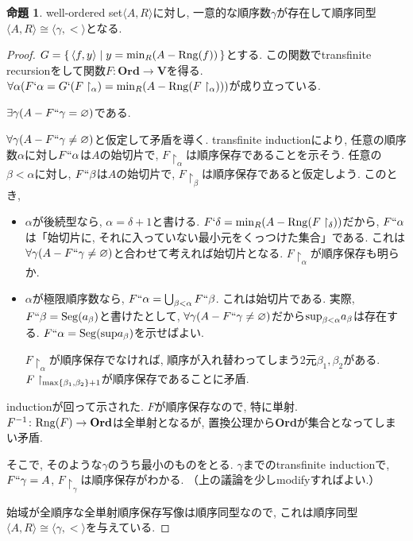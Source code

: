 \documentclass[a4paper, twoside]{bxjsarticle}
\theoremstyle{definition}
\newtheorem{prop}[thm]{命題}
\begin{document}
    \begin{prop}\label{ordinalthm}
        well-ordered set$\langle A, R\rangle$に対し, 一意的な順序数$\gamma$が存在して順序同型$\langle A, R\rangle \cong\langle\gamma, <\rangle$となる.
    \end{prop}
    \begin{proof}
        $G=\set{\langle f, y\rangle|y={\rm min}_R(A-{\rm Rng}(f))}$とする. この関数でtransfinite recursionをして関数$F\colon \textbf{Ord}\to\textbf{V}$を得る. $\forall \alpha (F`\alpha=G`(F\restriction_\alpha)={\rm min}_R(A-{\rm Rng}(F\restriction_\alpha)))$が成り立っている.
        
        $\exists \gamma(A-F``\gamma = \varnothing)$である.
        \begin{framed}
            $\forall \gamma(A-F``\gamma \neq\varnothing)$と仮定して矛盾を導く. transfinite inductionにより, 任意の順序数$\alpha$に対し$F``\alpha$は$A$の始切片で, $F\restriction_\alpha$は順序保存であることを示そう. 任意の$\beta<\alpha$に対し, $F``\beta$は$A$の始切片で, $F\restriction_\beta$は順序保存であると仮定しよう. このとき, 
            \begin{itemize}
                \item $\alpha$が後続型なら, $\alpha = \delta+1$と書ける. $F`\delta = {\rm min}_R(A-{\rm Rng}(F\restriction_\delta))$だから, $F``\alpha$は「始切片に, それに入っていない最小元をくっつけた集合」である. これは$\forall \gamma(A-F``\gamma \neq\varnothing)$と合わせて考えれば始切片となる. $F\restriction_\alpha$が順序保存も明らか.
                \item $\alpha$が極限順序数なら, $F``\alpha=\bigcup_{\beta<\alpha}F``\beta$. これは始切片である. 実際, $F``\beta = {\rm Seg}(a_\beta)$と書けたとして, $\forall \gamma(A-F``\gamma \neq\varnothing)$だから${\rm sup}_{\beta<\alpha}a_\beta$は存在する. $F``\alpha = {\rm Seg}({\rm sup}a_\beta)$を示せばよい.
                
                $F\restriction_\alpha$が順序保存でなければ, 順序が入れ替わってしまう2元$\beta_1, \beta_2$がある. $F\restriction_{{\rm max}\{\beta_1, \beta_2\}+1}$が順序保存であることに矛盾.
            \end{itemize}
            inductionが回って示された. $F$が順序保存なので, 特に単射. $F^{-1}\colon{\rm Rng}(F)\to\textbf{Ord}$は全単射となるが, 置換公理から\textbf{Ord}が集合となってしまい矛盾.
        \end{framed}
        そこで, そのような$\gamma$のうち最小のものをとる. $\gamma$までのtransfinite inductionで, $F``\gamma = A$, $F\restriction_\gamma$は順序保存がわかる. （上の議論を少しmodifyすればよい.）
        
        始域が全順序な全単射順序保存写像は順序同型なので, これは順序同型$\langle A, R\rangle \cong\langle\gamma, <\rangle$を与えている.
    \end{proof}
\end{document}
